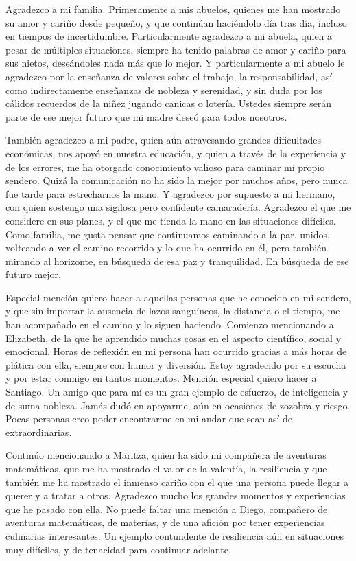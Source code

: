 \documentclass[letterpaper,twoside,12pt]{book}
\newcommand{\1}{\mathds{1}}
\theoremstyle{definition}
\theoremstyle{definition}
\theoremstyle{remark}
\theoremstyle{definition}
\theoremstyle{definition}
\theoremstyle{definition}
\theoremstyle{definition}
\theoremstyle{definition}
\begin{document}
Agradezco a mi familia. Primeramente a mis abuelos, quienes me han mostrado su amor y cariño desde pequeño, y que continúan haciéndolo día tras día, incluso en tiempos de incertidumbre. Particularmente agradezco a mi abuela, quien a pesar de múltiples situaciones, siempre ha tenido palabras de amor y cariño para sus nietos, deseándoles nada más que lo mejor. Y particularmente a mi abuelo le agradezco por la enseñanza de valores sobre el trabajo, la responsabilidad, así como indirectamente enseñanzas de nobleza y serenidad, y sin duda por los cálidos recuerdos de la niñez jugando canicas o lotería. Ustedes siempre serán parte de ese mejor futuro que mi madre deseó para todos nosotros.

También agradezco a mi padre, quien aún atravesando grandes dificultades económicas, nos apoyó en nuestra educación, y quien a través de la experiencia y de los errores, me ha otorgado conocimiento valioso para caminar mi propio sendero. Quizá la comunicación no ha sido la mejor por muchos años, pero nunca fue tarde para estrecharnos la mano. Y agradezco por supuesto a mi hermano, con quien sostengo una sigilosa pero confidente camaradería. Agradezco el que me considere en sus planes, y el que me tienda la mano en las situaciones difíciles. Como familia, me gusta pensar que continuamos caminando a la par, unidos, volteando a ver el camino recorrido y lo que ha ocurrido en él, pero también mirando al horizonte, en búsqueda de esa paz y tranquilidad. En búsqueda de ese futuro mejor.

Especial mención quiero hacer a aquellas personas que he conocido en mi sendero, y que sin importar la ausencia de lazos sanguíneos, la distancia o el tiempo, me han acompañado en el camino y lo siguen haciendo. Comienzo mencionando a Elizabeth, de la que he aprendido muchas cosas en el aspecto científico, social y emocional. Horas de reflexión en mi persona han ocurrido gracias a más horas de plática con ella, siempre con humor y diversión. Estoy agradecido por su escucha y por estar conmigo en tantos momentos. Mención especial quiero hacer a Santiago. Un amigo que para mí es un gran ejemplo de esfuerzo, de inteligencia y de suma nobleza. Jamás dudó en apoyarme, aún en ocasiones de zozobra y riesgo. Pocas personas creo poder encontrarme en mi andar que sean así de extraordinarias.

Continúo mencionando a Maritza, quien ha sido mi compañera de aventuras matemáticas, que me ha mostrado el valor de la valentía, la resiliencia y que también me ha mostrado el inmenso cariño con el que una persona puede llegar a querer y a tratar a otros. Agradezco mucho los grandes momentos y experiencias que he pasado con ella. No puede faltar una mención a Diego, compañero de aventuras matemáticas, de materias, y de una afición por tener experiencias culinarias interesantes. Un ejemplo contundente de resiliencia aún en situaciones muy difíciles, y de tenacidad para continuar adelante.
\end{document}
